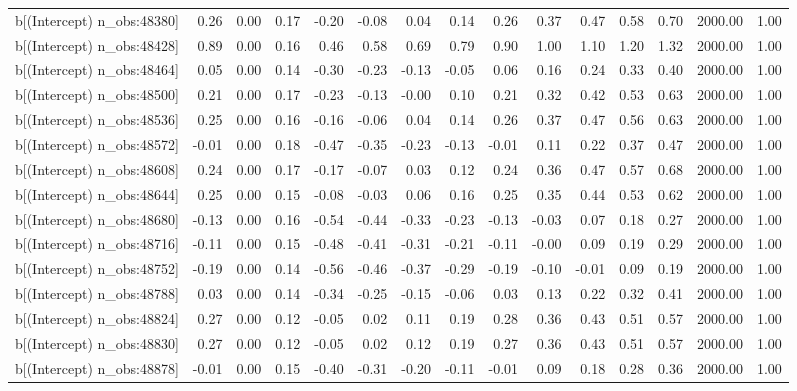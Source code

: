 \begin{table}[ht]
\begin{tabular}{rrrrrrrrrrrrrrr}
  b[(Intercept) n\_obs:48380] & 0.26 & 0.00 & 0.17 & -0.20 & -0.08 & 0.04 & 0.14 & 0.26 & 0.37 & 0.47 & 0.58 & 0.70 & 2000.00 & 1.00 \\ 
  b[(Intercept) n\_obs:48428] & 0.89 & 0.00 & 0.16 & 0.46 & 0.58 & 0.69 & 0.79 & 0.90 & 1.00 & 1.10 & 1.20 & 1.32 & 2000.00 & 1.00 \\ 
  b[(Intercept) n\_obs:48464] & 0.05 & 0.00 & 0.14 & -0.30 & -0.23 & -0.13 & -0.05 & 0.06 & 0.16 & 0.24 & 0.33 & 0.40 & 2000.00 & 1.00 \\ 
  b[(Intercept) n\_obs:48500] & 0.21 & 0.00 & 0.17 & -0.23 & -0.13 & -0.00 & 0.10 & 0.21 & 0.32 & 0.42 & 0.53 & 0.63 & 2000.00 & 1.00 \\ 
  b[(Intercept) n\_obs:48536] & 0.25 & 0.00 & 0.16 & -0.16 & -0.06 & 0.04 & 0.14 & 0.26 & 0.37 & 0.47 & 0.56 & 0.63 & 2000.00 & 1.00 \\ 
  b[(Intercept) n\_obs:48572] & -0.01 & 0.00 & 0.18 & -0.47 & -0.35 & -0.23 & -0.13 & -0.01 & 0.11 & 0.22 & 0.37 & 0.47 & 2000.00 & 1.00 \\ 
  b[(Intercept) n\_obs:48608] & 0.24 & 0.00 & 0.17 & -0.17 & -0.07 & 0.03 & 0.12 & 0.24 & 0.36 & 0.47 & 0.57 & 0.68 & 2000.00 & 1.00 \\ 
  b[(Intercept) n\_obs:48644] & 0.25 & 0.00 & 0.15 & -0.08 & -0.03 & 0.06 & 0.16 & 0.25 & 0.35 & 0.44 & 0.53 & 0.62 & 2000.00 & 1.00 \\ 
  b[(Intercept) n\_obs:48680] & -0.13 & 0.00 & 0.16 & -0.54 & -0.44 & -0.33 & -0.23 & -0.13 & -0.03 & 0.07 & 0.18 & 0.27 & 2000.00 & 1.00 \\ 
  b[(Intercept) n\_obs:48716] & -0.11 & 0.00 & 0.15 & -0.48 & -0.41 & -0.31 & -0.21 & -0.11 & -0.00 & 0.09 & 0.19 & 0.29 & 2000.00 & 1.00 \\ 
  b[(Intercept) n\_obs:48752] & -0.19 & 0.00 & 0.14 & -0.56 & -0.46 & -0.37 & -0.29 & -0.19 & -0.10 & -0.01 & 0.09 & 0.19 & 2000.00 & 1.00 \\ 
  b[(Intercept) n\_obs:48788] & 0.03 & 0.00 & 0.14 & -0.34 & -0.25 & -0.15 & -0.06 & 0.03 & 0.13 & 0.22 & 0.32 & 0.41 & 2000.00 & 1.00 \\ 
  b[(Intercept) n\_obs:48824] & 0.27 & 0.00 & 0.12 & -0.05 & 0.02 & 0.11 & 0.19 & 0.28 & 0.36 & 0.43 & 0.51 & 0.57 & 2000.00 & 1.00 \\ 
  b[(Intercept) n\_obs:48830] & 0.27 & 0.00 & 0.12 & -0.05 & 0.02 & 0.12 & 0.19 & 0.27 & 0.36 & 0.43 & 0.51 & 0.57 & 2000.00 & 1.00 \\ 
  b[(Intercept) n\_obs:48878] & -0.01 & 0.00 & 0.15 & -0.40 & -0.31 & -0.20 & -0.11 & -0.01 & 0.09 & 0.18 & 0.28 & 0.36 & 2000.00 & 1.00 \\ 

\end{tabular}
\end{table}
